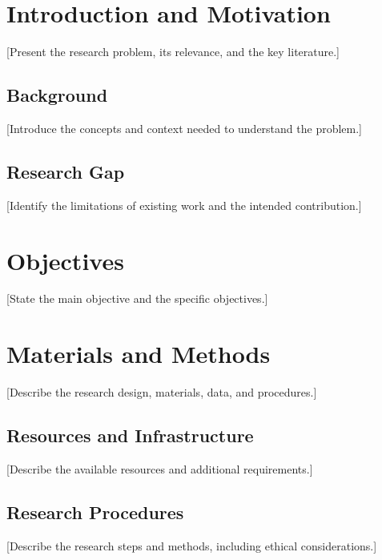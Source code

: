 \documentclass[a4paper,12pt]{article}
\begin{document}
\clearpage
\thispagestyle{empty}
\null
\vfill
\begin{abstract}
[Summarize the problem, objectives, methods, and
expected results.]
\end{abstract}
\vfill
\null
\clearpage


\section{Introduction and Motivation}
[Present the research problem, its relevance, and the
key literature.]

\subsection{Background}
[Introduce the concepts and context needed to
understand the problem.]

\subsection{Research Gap}
[Identify the limitations of existing work and the
intended contribution.]


\section{Objectives}
[State the main objective and the specific objectives.]

\section{Materials and Methods}
[Describe the research design, materials, data, and
procedures.]

\subsection{Resources and Infrastructure}
[Describe the available resources and additional
requirements.]

\subsection{Research Procedures}
[Describe the research steps and methods, including
ethical considerations.]
\end{document}
